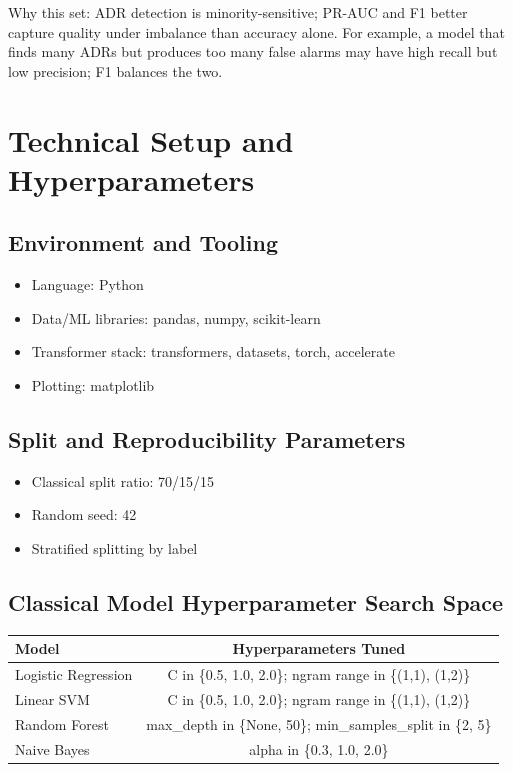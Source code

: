 \documentclass[11pt]{article}
\begin{document}
Why this set: ADR detection is minority-sensitive; PR-AUC and F1 better capture quality under imbalance than accuracy alone. For example, a model that finds many ADRs but produces too many false alarms may have high recall but low precision; F1 balances the two.


\section{Technical Setup and Hyperparameters}

\subsection{Environment and Tooling}

\begin{itemize}
  \item Language: Python
  \item Data/ML libraries: pandas, numpy, scikit-learn
  \item Transformer stack: transformers, datasets, torch, accelerate
  \item Plotting: matplotlib
\end{itemize}

\subsection{Split and Reproducibility Parameters}

\begin{itemize}
  \item Classical split ratio: 70/15/15
  \item Random seed: 42
  \item Stratified splitting by label
\end{itemize}

\subsection{Classical Model Hyperparameter Search Space}

\begin{table}[H]
\centering
\begin{tabular}{lc}
\toprule
Model & Hyperparameters Tuned \\
\midrule
Logistic Regression & C in \{0.5, 1.0, 2.0\}; ngram range in \{(1,1), (1,2)\} \\
Linear SVM & C in \{0.5, 1.0, 2.0\}; ngram range in \{(1,1), (1,2)\} \\
Random Forest & max\_depth in \{None, 50\}; min\_samples\_split in \{2, 5\} \\
Naive Bayes & alpha in \{0.3, 1.0, 2.0\} \\
\bottomrule
\end{tabular}
\end{table}
\end{document}
